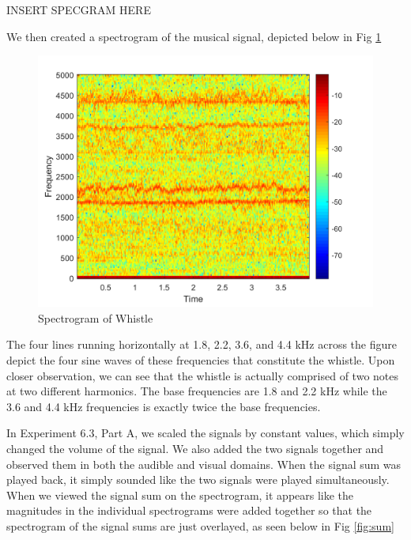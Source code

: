 \documentclass[10pt]{article}
\begin{document}
INSERT SPECGRAM HERE

We then created a spectrogram of the musical signal, depicted below in Fig  \ref*{fig:whistle}

\begin{centering}
	\begin{figure} [H]
		\centering
		\includegraphics[scale=0.5]{images/sig2specgram.png}
		\caption{Spectrogram of Whistle}
		\label{fig:whistle}
	\end{figure}
\end{centering}

The four lines running horizontally at 1.8, 2.2, 3.6, and 4.4 kHz across the figure depict the four sine waves of these frequencies that constitute the whistle. 
Upon closer observation, we can see that the whistle is actually comprised of two notes at two different harmonics. The base frequencies are 1.8 and 2.2 kHz while the 3.6 and 4.4 kHz frequencies is exactly twice the base frequencies. 

In Experiment 6.3, Part A, we scaled the signals by constant values, which simply changed the volume of the signal. We also added the two signals together and observed them in both the audible and visual domains. When the signal sum was played back, it simply sounded like the two signals were played simultaneously. When we viewed the signal sum on the spectrogram, it appears like the magnitudes in the individual spectrograms were added together so that the spectrogram of the signal sums are just overlayed, as seen below in Fig \ref{fig:sum}
\end{document}
